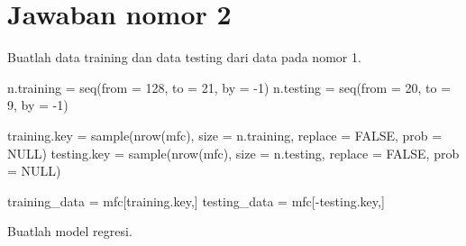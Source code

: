 \documentclass[
]{article}
\newenvironment{Shaded}{\begin{snugshade}}{\end{snugshade}}
\newcommand{\AttributeTok}[1]{\textcolor[rgb]{0.77,0.63,0.00}{#1}}
\newcommand{\ConstantTok}[1]{\textcolor[rgb]{0.00,0.00,0.00}{#1}}
\newcommand{\DecValTok}[1]{\textcolor[rgb]{0.00,0.00,0.81}{#1}}
\newcommand{\FunctionTok}[1]{\textcolor[rgb]{0.00,0.00,0.00}{#1}}
\newcommand{\NormalTok}[1]{#1}
\newcommand{\OtherTok}[1]{\textcolor[rgb]{0.56,0.35,0.01}{#1}}
\newcommand{\SpecialCharTok}[1]{\textcolor[rgb]{0.00,0.00,0.00}{#1}}
\newcommand{\StringTok}[1]{\textcolor[rgb]{0.31,0.60,0.02}{#1}}
\begin{document}
\hypertarget{jawaban-nomor-2}{%
\section{Jawaban nomor 2}\label{jawaban-nomor-2}}

Buatlah data training dan data testing dari data pada nomor 1.

\begin{Shaded}
\begin{Highlighting}[]
\NormalTok{n.training }\OtherTok{=} \FunctionTok{seq}\NormalTok{(}\AttributeTok{from =} \DecValTok{128}\NormalTok{, }\AttributeTok{to =} \DecValTok{21}\NormalTok{, }\AttributeTok{by =} \SpecialCharTok{{-}}\DecValTok{1}\NormalTok{)}
\NormalTok{n.testing }\OtherTok{=} \FunctionTok{seq}\NormalTok{(}\AttributeTok{from =} \DecValTok{20}\NormalTok{, }\AttributeTok{to =} \DecValTok{9}\NormalTok{, }\AttributeTok{by =} \SpecialCharTok{{-}}\DecValTok{1}\NormalTok{)}

\NormalTok{training.key }\OtherTok{=} \FunctionTok{sample}\NormalTok{(}\FunctionTok{nrow}\NormalTok{(mfc), }\AttributeTok{size =}\NormalTok{ n.training, }\AttributeTok{replace =} \ConstantTok{FALSE}\NormalTok{, }\AttributeTok{prob =} \ConstantTok{NULL}\NormalTok{)}
\NormalTok{testing.key }\OtherTok{=} \FunctionTok{sample}\NormalTok{(}\FunctionTok{nrow}\NormalTok{(mfc), }\AttributeTok{size =}\NormalTok{ n.testing, }\AttributeTok{replace =} \ConstantTok{FALSE}\NormalTok{, }\AttributeTok{prob =} \ConstantTok{NULL}\NormalTok{)}

\NormalTok{training\_data }\OtherTok{=}\NormalTok{ mfc[training.key,]}
\NormalTok{testing\_data }\OtherTok{=}\NormalTok{ mfc[}\SpecialCharTok{{-}}\NormalTok{testing.key,]}
\end{Highlighting}
\end{Shaded}

Buatlah model regresi.

\begin{Shaded}
\end{Shaded}
\end{document}
